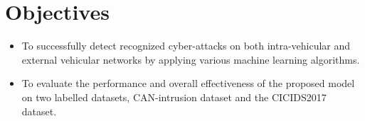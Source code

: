 \section{Objectives}
\begin{itemize}
\item To successfully detect recognized cyber-attacks on both intra-vehicular and external vehicular networks by applying various machine learning algorithms.
\item To evaluate the performance and overall effectiveness of
the proposed model on two labelled datasets, CAN-intrusion dataset and the CICIDS2017 dataset.

\end{itemize} 
